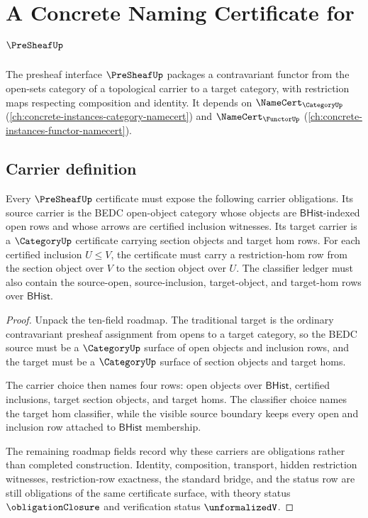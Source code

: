 \chapter{A Concrete Naming Certificate for $\PreSheafUp$}
\label{ch:concrete-instances-presheaf-namecert}

The presheaf interface $\PreSheafUp$ packages a contravariant functor from the open-sets category of a topological carrier to a target category, with restriction maps respecting composition and identity. It depends on $\NameCert_{\CategoryUp}$ (\autoref{ch:concrete-instances-category-namecert}) and $\NameCert_{\FunctorUp}$ (\autoref{ch:concrete-instances-functor-namecert}).

\section{Carrier definition}
\label{sec:presheaf-carrier}

\begin{theorem}\label{thm:presheaf-source-target-carriers}
Every $\PreSheafUp$ certificate must expose the following carrier obligations. Its source carrier is the BEDC open-object category whose objects are $\mathsf{BHist}$-indexed open rows and whose arrows are certified inclusion witnesses. Its target carrier is a $\CategoryUp$ certificate carrying section objects and target hom rows. For each certified inclusion $U\le V$, the certificate must carry a restriction-hom row from the section object over $V$ to the section object over $U$. The classifier ledger must also contain the source-open, source-inclusion, target-object, and target-hom rows over $\mathsf{BHist}$.
\end{theorem}
\begin{proof}
Unpack the ten-field roadmap. The traditional target is the ordinary contravariant presheaf assignment from opens to a target category, so the BEDC source must be a $\CategoryUp$ surface of open objects and inclusion rows, and the target must be a $\CategoryUp$ surface of section objects and target homs.

The carrier choice then names four rows: open objects over $\mathsf{BHist}$, certified inclusions, target section objects, and target homs. The classifier choice names the target hom classifier, while the visible source boundary keeps every open and inclusion row attached to $\mathsf{BHist}$ membership.

The remaining roadmap fields record why these carriers are obligations rather than completed construction. Identity, composition, transport, hidden restriction witnesses, restriction-row exactness, the standard bridge, and the status row are still obligations of the same certificate surface, with theory status $\obligationClosure$ and verification status $\unformalizedV$.
\end{proof}

